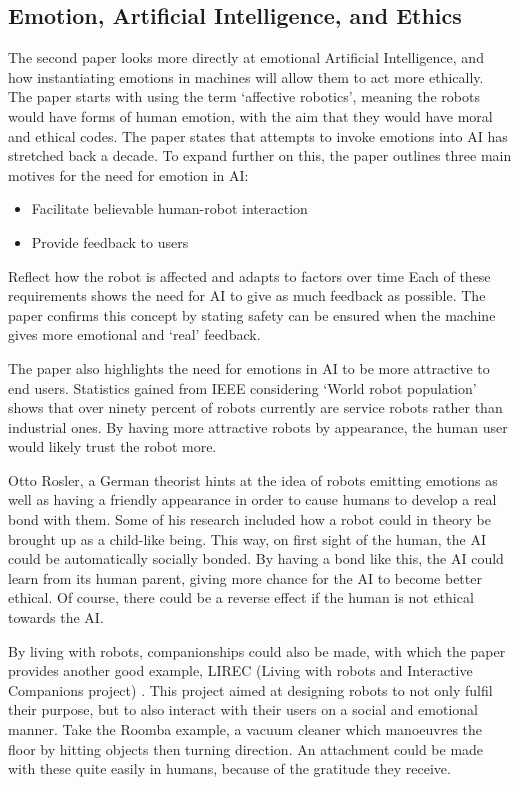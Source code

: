 \documentclass[article]{IEEEtran}
\begin{document}
\subsection{Emotion, Artificial Intelligence, and Ethics}
The second paper \cite{} looks more directly at emotional Artificial Intelligence, and how instantiating emotions in machines will allow them to act more ethically. The paper starts with using the term ‘affective robotics’, meaning the robots would have forms of human emotion, with the aim that they would have moral and ethical codes. The paper states that attempts to invoke emotions into AI has stretched back a decade.
To expand further on this, the paper outlines three main motives for the need for emotion in AI:
\begin{itemize}
\item Facilitate believable human-robot interaction
\item Provide feedback to users
\end{itemize}
Reflect how the robot is affected and adapts to factors over time
Each of these requirements shows the need for AI to give as much feedback as possible. The paper confirms this concept by stating safety can be ensured when the machine gives more emotional and ‘real’ feedback. \par
The paper also highlights the need for emotions in AI to be more attractive to end users. Statistics gained from IEEE considering ‘World robot population’ shows that over ninety percent of robots currently are service robots rather than industrial ones. By having more attractive robots by appearance, the human user would likely trust the robot more. \par
Otto Rosler, a German theorist hints at the idea of robots emitting emotions as well as having a friendly appearance in order to cause humans to develop a real bond with them. Some of his research included how a robot could in theory be brought up as a child-like being. This way, on first sight of the human, the AI could be automatically socially bonded. By having a bond like this, the AI could learn from its human parent, giving more chance for the AI to become better ethical. Of course, there could be a reverse effect if the human is not ethical towards the AI. \par
By living with robots, companionships could also be made, with which the paper provides another good example, LIREC (Living with robots and Interactive Companions project) \cite{lirec}. This project aimed at designing robots to not only fulfil their purpose, but to also interact with their users on a social and emotional manner. Take the Roomba example, a vacuum cleaner which manoeuvres the floor by hitting objects then turning direction. An attachment could be made with these quite easily in humans, because of the gratitude they receive. \par
\end{document}
